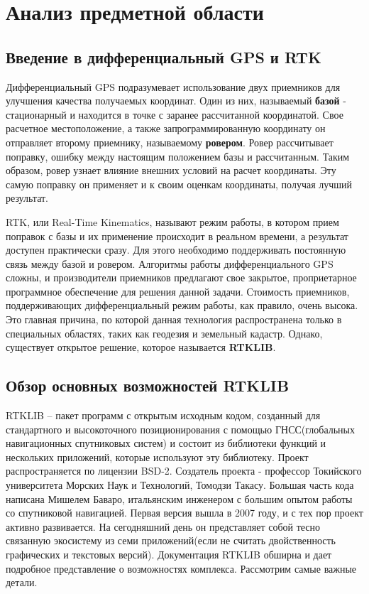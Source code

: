 \chapter{Анализ предметной области} \label{chapt1}

\section{Введение в дифференциальный GPS и RTK} \label{sect1_1}

Дифференциальный GPS подразумевает использование двух приемников для улучшения качества получаемых координат. Один из них, называемый \textbf{базой} - стационарный и находится в точке с заранее рассчитанной координатой. Свое расчетное местоположение, а также запрограммированную координату он отправляет второму приемнику, называемому \textbf{ровером}. Ровер рассчитывает поправку, ошибку между настоящим положением базы и рассчитанным. Таким образом, ровер узнает влияние внешних условий на расчет координаты. Эту самую поправку он применяет и к своим оценкам координаты, получая лучший результат.

RTK, или Real-Time Kinematics, называют режим работы, в котором прием поправок с базы и их применение происходит в реальном времени, а результат доступен практически сразу. Для этого необходимо поддерживать постоянную связь между базой и ровером. Алгоритмы работы дифференциального GPS сложны, и производители приемников предлагают свое закрытое, проприетарное программное обеспечение для решения данной задачи. Стоимость приемников, поддерживающих дифференциальный режим работы, как правило, очень высока. Это главная причина, по которой данная технология распространена только в специальных областях, таких как геодезия и земельный кадастр. Однако, существует открытое решение, которое называется \textbf{RTKLIB}.

\section{Обзор основных возможностей RTKLIB} \label{sect1_2}

RTKLIB – пакет программ с открытым исходным кодом, созданный для стандартного и высокоточного позиционирования с помощью ГНСС(глобальных навигационных спутниковых систем) и состоит из библиотеки функций и нескольких приложений, которые используют эту библиотеку. Проект распространяется по лицензии BSD-2. Создатель проекта -  профессор Токийского университета Морских Наук и Технологий, Томодзи Такасу. Большая часть кода написана Мишелем Баваро, итальянским инженером с большим опытом работы со спутниковой навигацией. Первая версия вышла в 2007 году, и с тех пор проект активно развивается. На сегодняшний день он представляет собой тесно связанную экосистему из семи приложений(если не считать двойственность графических и текстовых версий). Документация RTKLIB \cite{rtklib-docs} обширна и дает подробное представление о возможностях комплекса. Рассмотрим самые важные детали.

